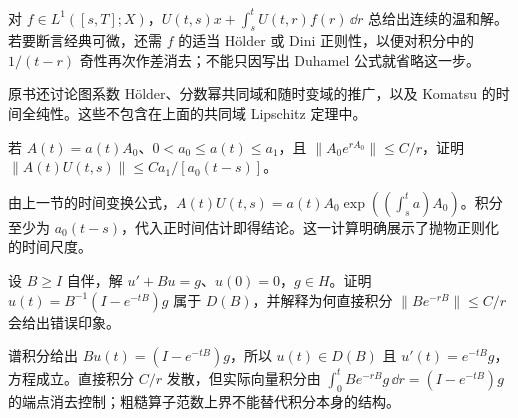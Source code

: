 对 $f\in L^1([s,T];X)$，$U(t,s)x+\int_s^tU(t,r)f(r)\,\dd r$ 总给出连续的温和解。若要断言经典可微，还需 $f$ 的适当 Hölder 或 Dini 正则性，以便对积分中的 $1/(t-r)$ 奇性再次作差消去；不能只因写出 Duhamel 公式就省略这一步。

原书还讨论图系数 Hölder、分数幂共同域和随时变域的推广，以及 Komatsu 的时间全纯性。这些不包含在上面的共同域 Lipschitz 定理中。

\begin{exercise}[时间变换的平滑估计]\label{ex:y14-parabolic-time-change}
若 $A(t)=a(t)A_0$、$0<a_0\le a(t)\le a_1$，且 $\|A_0e^{rA_0}\|\le C/r$，证明 $\|A(t)U(t,s)\|\le Ca_1/[a_0(t-s)]$。
\end{exercise}
\begin{solution}
由上一节的时间变换公式，$A(t)U(t,s)=a(t)A_0\exp((\int_s^ta)A_0)$。积分至少为 $a_0(t-s)$，代入正时间估计即得结论。这一计算明确展示了抛物正则化的时间尺度。
\end{solution}

\begin{exercise}[常强迫项的消去]\label{ex:y14-forcing-cancellation}
设 $B\ge I$ 自伴，解 $u'+Bu=g$、$u(0)=0$，$g\in H$。证明 $u(t)=B^{-1}(I-e^{-tB})g$ 属于 $D(B)$，并解释为何直接积分 $\|Be^{-rB}\|\le C/r$ 会给出错误印象。
\end{exercise}
\begin{solution}
谱积分给出 $Bu(t)=(I-e^{-tB})g$，所以 $u(t)\in D(B)$ 且 $u'(t)=e^{-tB}g$，方程成立。直接积分 $C/r$ 发散，但实际向量积分由 $\int_0^tBe^{-rB}g\,\dd r=(I-e^{-tB})g$ 的端点消去控制；粗糙算子范数上界不能替代积分本身的结构。
\end{solution}
